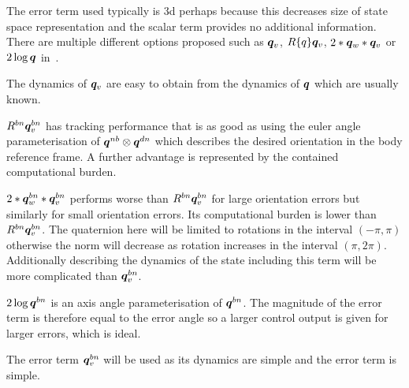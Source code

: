 The error term used typically is 3d perhaps because this decreases size of state space representation and the scalar term provides no additional information.
There are multiple different options proposed such as $\bm q_v$, $R\{q\}\bm q_v$, $2 * \bm q_w * \bm q_v$ or $2 \log \bm q$ in~\cite{Bla2010, dewolf2019, Caccavale1998}.

The dynamics of $\bm q_v$ are easy to obtain from the dynamics of $\bm q$ which are usually known.

$R^{bn}\bm q_v^{bn}$ has tracking performance that is as good as using the euler angle parameterisation of $\bm q^{nb} \otimes \bm q^{dn}$ which describes the desired orientation in the body reference frame.
A further advantage is represented by the contained computational burden.

$2 * \bm q^{bn}_w * \bm q_v^{bn}$ performs worse than $R^{bn}\bm q_v^{bn}$ for large orientation errors but similarly for small orientation errors. Its computational burden is lower than $R^{bn}\bm q_v^{bn}$.
The quaternion here will be limited to rotations in the interval $(-\pi, \pi)$ otherwise the norm will decrease as rotation increases in the interval $(\pi, 2\pi)$.
Additionally describing the dynamics of the state including this term will be more complicated than $\bm q_v^{bn}$.

$2 \log \bm q^{bn}$ is an axis angle parameterisation of $\bm q^{bn}$.
The magnitude of the error term is therefore equal to the error angle so a larger control output is given for larger errors, which is ideal.

The error term $\bm q_v^{bn}$ will be used as its dynamics are simple and the error term is simple.